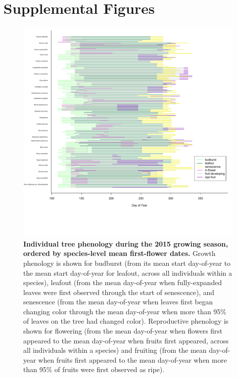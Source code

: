 \documentclass{article}
\begin{document}
\section* {Supplemental Figures}

\begin{figure}[h]
  \centering
  \includegraphics{../analyses/figures/grosea_repsort_ripefruit_ind_legend.pdf}
  \caption{\textbf{Individual tree phenology during the 2015 growing season, ordered by species-level mean first-flower dates.} Growth phenology is shown for budburst (from its mean start day-of-year to the mean start day-of-year for leafout, across all individuals within a species), leafout (from the mean day-of-year when fully-expanded leaves were first observed through the start of senescence), and senescence (from the mean day-of-year when leaves first began changing color through the mean day-of-year when more than 95\% of leaves on the tree had changed color). Reproductive phenology is shown for flowering (from the mean day-of-year when flowers first appeared to the mean day-of-year when fruits first appeared, across all individuals within a species) and fruiting (from the mean day-of-year when fruits first appeared to the mean day-of-year when more than 95\% of fruits were first observed as ripe).}
 \label{fig:focind}
\end{figure}
  
\end{document}

